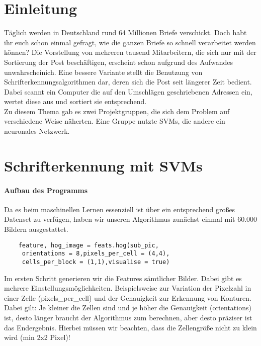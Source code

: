 \section{Einleitung}

Täglich werden in Deutschland rund 64 Millionen Briefe verschickt. Doch habt ihr euch schon einmal gefragt, wie die ganzen Briefe so schnell verarbeitet werden können? Die Vorstellung von mehreren tausend Mitarbeitern, die sich nur mit der Sortierung der Post beschäftigen, erscheint schon aufgrund des Aufwandes unwahrscheinich. Eine bessere Variante stellt die Benutzung von Schrifterkennungsalgorithmen dar, deren sich die Post seit längerer Zeit bedient. Dabei scannt ein Computer die auf den Umschlägen geschriebenen Adressen ein, wertet diese aus und sortiert sie entsprechend. \\
Zu diesem Thema gab es zwei Projektgruppen, die sich dem Problem auf verschiedene Weise näherten. Eine Gruppe nutzte SVMs, die andere ein neuronales Netzwerk.


\section{Schrifterkennung mit SVMs}

\paragraph{Aufbau des Programms}

Da es beim maschinellen Lernen essenziell ist über ein entsprechend großes Datenset zu verfügen, haben wir unseren Algorithmus zunächst einmal mit 60.000 Bildern ausgestattet. 

\begin{verbatim}
	feature, hog_image = feats.hog(sub_pic,
	 orientations = 8,pixels_per_cell = (4,4),
	 cells_per_block = (1,1),visualise = true)
\end{verbatim}
Im ersten Schritt generieren wir die Features sämtlicher Bilder. Dabei gibt es mehrere Einstellungsmöglichkeiten. Beispielsweise zur Variation der Pixelzahl in einer Zelle (pixels_per_cell) und der Genauigkeit zur Erkennung von Konturen. Dabei gilt: Je kleiner die Zellen sind und je höher die Genauigkeit (orientations) ist, desto länger braucht der Algorithmus zum berechnen, aber desto präziser ist das Endergebnis. Hierbei müssen wir beachten, dass die Zellengröße nicht zu klein wird (min 2x2 Pixel)!

\begin{verbatim}

\end{verbatim}

